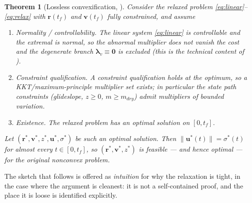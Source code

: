 \documentclass[11pt]{article}
\newtheorem{theorem}{Theorem}
\newcommand{\rvec}{\mathbf{r}}
\newcommand{\vvec}{\mathbf{v}}
\newcommand{\uvec}{\mathbf{u}}
\newcommand{\lamv}{\boldsymbol{\lambda}_v}
\begin{document}
\begin{theorem}[Lossless convexification, \cite{acikmese2007,acikmese2011}]
\label{thm:lossless}
Consider the relaxed problem \eqref{eq:linear}--\eqref{eq:relax} with
$\rvec(t_f)$ and $\vvec(t_f)$ fully constrained, and assume
%
\begin{enumerate}
\item[(A1)] \emph{Normality / controllability.} The linear system
\eqref{eq:linear} is controllable and the extremal is normal, so the
abnormal multiplier does not vanish the cost and the degenerate branch
$\lamv \equiv \mathbf{0}$ is excluded (this is the technical content of
\cite{acikmese2011}).
\item[(A2)] \emph{Constraint qualification.} A constraint qualification
holds at the optimum, so a KKT/maximum-principle multiplier set exists;
in particular the state path constraints (glideslope, $z\ge0$,
$m \ge m_{dry}$) admit multipliers of bounded variation.
\item[(A3)] \emph{Existence.} The relaxed problem has an optimal solution
on $[0,t_f]$.
\end{enumerate}
%
Let $(\rvec^\ast, \vvec^\ast, z^\ast, \uvec^\ast, \sigma^\ast)$ be such an
optimal solution.
Then $\lVert \uvec^\ast(t)\rVert = \sigma^\ast(t)$ for almost every
$t \in [0,t_f]$, so $(\rvec^\ast, \vvec^\ast, z^\ast)$ is feasible --- and
hence optimal --- for the original nonconvex problem.
\end{theorem}

The sketch that follows is offered as \emph{intuition} for why the
relaxation is tight, in the case where the argument is cleanest: it is not
a self-contained proof, and the place it is loose is identified explicitly.
\end{document}
